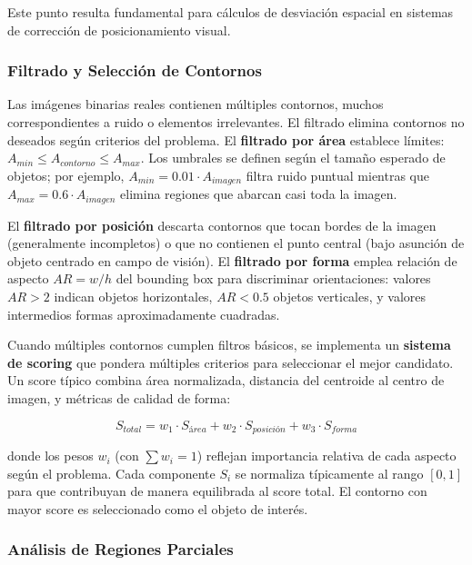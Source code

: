 Este punto resulta fundamental para cálculos de desviación espacial en sistemas de corrección de posicionamiento visual.

\subsubsection{Filtrado y Selección de Contornos}

Las imágenes binarias reales contienen múltiples contornos, muchos correspondientes a ruido o elementos irrelevantes. El filtrado elimina contornos no deseados según criterios del problema. El \textbf{filtrado por área} establece límites: $A_{min} \leq A_{contorno} \leq A_{max}$. Los umbrales se definen según el tamaño esperado de objetos; por ejemplo, $A_{min} = 0.01 \cdot A_{imagen}$ filtra ruido puntual mientras que $A_{max} = 0.6 \cdot A_{imagen}$ elimina regiones que abarcan casi toda la imagen.

El \textbf{filtrado por posición} descarta contornos que tocan bordes de la imagen (generalmente incompletos) o que no contienen el punto central (bajo asunción de objeto centrado en campo de visión). El \textbf{filtrado por forma} emplea relación de aspecto $AR = w/h$ del bounding box para discriminar orientaciones: valores $AR > 2$ indican objetos horizontales, $AR < 0.5$ objetos verticales, y valores intermedios formas aproximadamente cuadradas.

Cuando múltiples contornos cumplen filtros básicos, se implementa un \textbf{sistema de scoring} que pondera múltiples criterios para seleccionar el mejor candidato. Un score típico combina área normalizada, distancia del centroide al centro de imagen, y métricas de calidad de forma:

\begin{equation}
S_{total} = w_1 \cdot S_{área} + w_2 \cdot S_{posición} + w_3 \cdot S_{forma}
\end{equation}

donde los pesos $w_i$ (con $\sum w_i = 1$) reflejan importancia relativa de cada aspecto según el problema. Cada componente $S_i$ se normaliza típicamente al rango $[0,1]$ para que contribuyan de manera equilibrada al score total. El contorno con mayor score es seleccionado como el objeto de interés.

\subsubsection{Análisis de Regiones Parciales}

